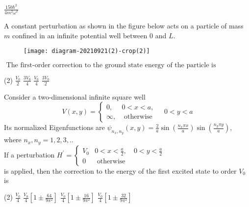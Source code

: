 \begin{enumerate}
\begin{tasks}
	\task[\textbf{D.}]$\frac{15 b \hbar^{2}}{4 m^{2} \omega^{2}}$
\end{tasks}
\begin{minipage}{\textwidth}
	\item A constant perturbation as shown in the figure below acts on a particle of mass $m$ confined in an infinite potential well between 0 and $L$.\\
	\begin{figure}[H]
		\centering
		\texttt{[image: diagram-20210921(2)-crop(2)]}
	\end{figure}
	$\text { The first-order correction to the ground state energy of the particle is }$
\end{minipage}
\begin{tasks}(2)
	\task[\textbf{A.}] $\frac{V_{0}}{2}$
	\task[\textbf{B.}]$\frac{3 V_{0}}{4}$
	\task[\textbf{C.}]$\frac{V_{0}}{4}$
	\task[\textbf{D.}] $\frac{3 V_{0}}{2}$
\end{tasks}
\begin{minipage}{\textwidth}
	\item Consider a two-dimensional infinite square well
	$$
	V(x, y)=\left\{\begin{array}{ll}
	0, & 0<x<a, \\
	\infty, & \text { otherwise }
	\end{array} \quad 0<y<a\right.
	$$
	Its normalized Eigenfunctions are $\psi_{n_{x}, n_{y}}(x, y)=\frac{2}{a} \sin \left(\frac{n_{x} \pi x}{a}\right) \sin \left(\frac{n_{y} \pi y}{a}\right)$,
	where $n_{x}, n_{y}=1,2,3, . .$\\
	If a perturbation $H^{\prime}=\left\{\begin{array}{cc}V_{0} & 0<x<\frac{a}{2}, \quad 0<y<\frac{a}{2} \\ 0 & \text { otherwise }\end{array}\right.$ \\is applied, then the correction to the
	energy of the first excited state to order $V_{0}$ is
\end{minipage}
\begin{tasks}(2)
	\task[\textbf{A.}] $\frac{V_{0}}{4}$
	\task[\textbf{B.}]$\frac{V_{0}}{4}\left[1 \pm \frac{64}{9 \pi^{2}}\right]$
	\task[\textbf{C.}]$\frac{V_{0}}{4}\left[1 \pm \frac{16}{9 \pi^{2}}\right]$
	\task[\textbf{D.}]$\frac{V_{0}}{4}\left[1 \pm \frac{32}{9 \pi^{2}}\right]$
\end{tasks}
\begin{minipage}{\textwidth}

\end{minipage}
\end{enumerate}
